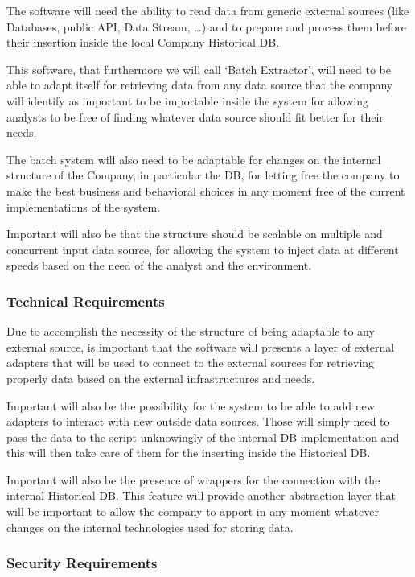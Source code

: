 The software will need the ability to read data from generic external sources (like Databases, public API, Data Stream, …) and to prepare and process them before their insertion inside the local Company Historical DB.

This software, that furthermore we will call ‘Batch Extractor’, will need to be able to adapt itself for retrieving data from any data source that the company will identify as important to be importable inside the system for allowing analysts to be free of finding whatever data source should fit better for their needs.

The batch system will also need to be adaptable for changes on the internal structure of the Company, in particular the DB, for letting free the company to make the best business and behavioral choices in any moment free of the current implementations of the system.

Important will also be that the structure should be scalable on multiple and concurrent input data source, for allowing the system to inject data at different speeds based on the need of the analyst and the environment.

\subsubsection{Technical Requirements}

Due to accomplish the necessity of the structure of being adaptable to any external source, is important that the software will presents a layer of external adapters that will be used to connect to the external sources for retrieving properly data based on the external infrastructures and needs. 

Important will also be the possibility for the system to be able to add new adapters to interact with new outside data sources. Those will simply need to pass the data to the script unknowingly of the internal DB implementation and this will then take care of them for the inserting inside the Historical DB.

Important will also be the presence of wrappers for the connection with the internal Historical DB. 
This feature will provide another abstraction layer that will be important to allow the company to apport in any moment whatever changes on the internal technologies used for storing data.

\subsubsection{Security Requirements}

